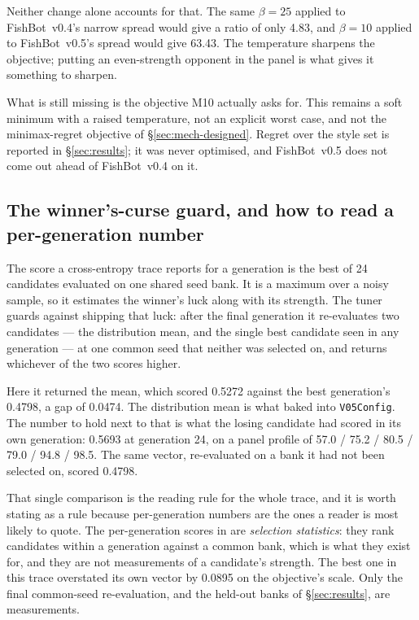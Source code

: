 \documentclass[11pt]{article}
\theoremstyle{definition}
\DeclareRobustCommand{\vfive}{\texorpdfstring{\mbox{FishBot v0.5}}{FishBot v0.5}}
\DeclareRobustCommand{\vfour}{\texorpdfstring{\mbox{FishBot v0.4}}{FishBot v0.4}}
\providecommand{\numSoftMinBeta}{10}
\providecommand{\numFitPop}{24}
\providecommand{\numFitBeta}{25}
\providecommand{\numFitRatioAtTen}{63.43}
\providecommand{\numFitRatioCross}{4.83}
\providecommand{\numFitScore}{0.5693}
\providecommand{\numFitBestGen}{24}
\providecommand{\numFitProfile}{57.0 / 75.2 / 80.5 / 79.0 / 94.8 / 98.5}
\providecommand{\numFitGuardWinner}{mean}
\providecommand{\numFitGuardMu}{0.5272}
\providecommand{\numFitGuardBest}{0.4798}
\providecommand{\numFitGuardGap}{0.0474}
\providecommand{\numFitCurse}{0.0895}
\begin{document}
Neither change alone accounts for that. The same $\beta = \numFitBeta$ applied to
\vfour{}'s narrow spread would give a ratio of only \numFitRatioCross{}, and
$\beta = \numSoftMinBeta$ applied to \vfive{}'s spread would give
\numFitRatioAtTen{}. The temperature sharpens the objective; putting an
even-strength opponent in the panel is what gives it something to sharpen.

What is still missing is the objective M10 actually asks for. This remains a soft
minimum with a raised temperature, not an explicit worst case, and not the
minimax-regret objective of \S\ref{sec:mech-designed}. Regret over the style set
is reported in \S\ref{sec:results}; it was never optimised, and \vfive{} does not
come out ahead of \vfour{} on it.

\subsection{The winner's-curse guard, and how to read a per-generation number}
\label{sec:fit-guard}

The score a cross-entropy trace reports for a generation is the best of
\numFitPop{} candidates evaluated on one shared seed bank. It is a maximum over a
noisy sample, so it estimates the winner's luck along with its strength. The
tuner guards against shipping that luck: after the final generation it
re-evaluates two candidates --- the distribution mean, and the single best
candidate seen in any generation --- at one common seed that neither was selected
on, and returns whichever of the two scores higher.

Here it returned the \numFitGuardWinner{}, which scored \numFitGuardMu{} against
the best generation's \numFitGuardBest{}, a gap of \numFitGuardGap{}. The
distribution mean is what  baked into
\texttt{V05Config}. The number to hold next to that is what the losing candidate
had scored in its own generation: \numFitScore{} at generation
\numFitBestGen{}, on a panel profile of \numFitProfile{}. The same vector,
re-evaluated on a bank it had not been selected on, scored \numFitGuardBest{}.

That single comparison is the reading rule for the whole trace, and it is worth
stating as a rule because per-generation numbers are the ones a reader is most
likely to quote. The per-generation scores in
 are \emph{selection statistics}:
they rank candidates within a generation against a common bank, which is what
they exist for, and they are not measurements of a candidate's strength. The best
one in this trace overstated its own vector by \numFitCurse{} on the objective's
scale. Only the final common-seed re-evaluation, and the held-out banks of
\S\ref{sec:results}, are measurements.
\end{document}
